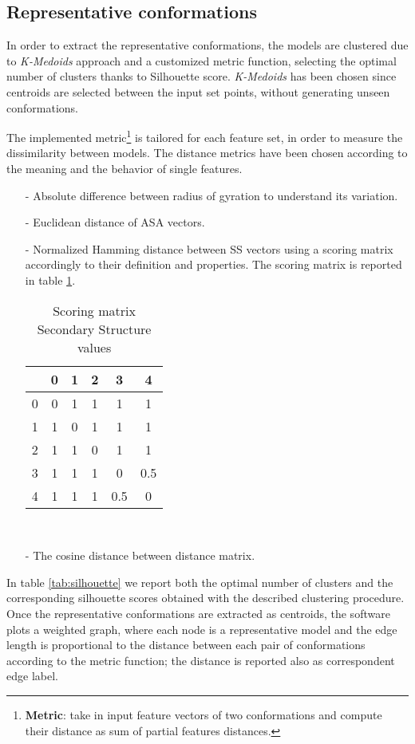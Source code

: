 \subsection{Representative conformations}
In order to extract the representative conformations, the models are clustered due to \emph{K-Medoids} approach and a customized metric function, selecting the optimal number of clusters thanks to Silhouette score.
\emph{K-Medoids} has been chosen since centroids are selected between the input set points, without generating unseen conformations.

\medskip
The implemented metric\footnote{\textbf{Metric}: take in input feature vectors of two conformations and compute their distance as sum of partial features distances.} is tailored for each feature set, in order to measure the dissimilarity between models. The distance metrics have been chosen according to the meaning and the behavior of single features. %
\begin{itemize}
\item[-] Absolute difference between radius of gyration to understand its variation.
\item[-] Euclidean distance of ASA vectors.
\item[-] Normalized Hamming distance between SS vectors using a scoring matrix accordingly to their definition and properties. The scoring matrix is reported in table \ref{tab:score}.

\begin{table}[H]
\begin{center}
\begin{tabular}{c|ccccc}
& 0 & 1 & 2 & 3 & 4 \\
\hline
0 & 0 & 1 & 1 & 1 & 1\\
1 & 1 & 0 & 1 & 1 & 1\\
2 & 1 & 1 & 0 & 1 & 1\\
3 & 1 & 1 & 1 & 0 & 0.5\\
4 & 1 & 1 & 1 & 0.5 & 0\\
\end{tabular}
\end{center}
\caption{Scoring matrix Secondary Structure values}~\label{tab:score}
\end{table}

\item[-] The cosine distance between distance matrix. 
\end{itemize}

In table \ref{tab:silhouette} we report both the optimal number of clusters and the corresponding silhouette scores obtained with the described clustering procedure. 
Once the representative conformations are extracted as centroids, the software plots a weighted graph, where each node is a representative model and the edge length is proportional to the distance between each pair of conformations according to the metric function; the distance is reported also as correspondent edge label.

